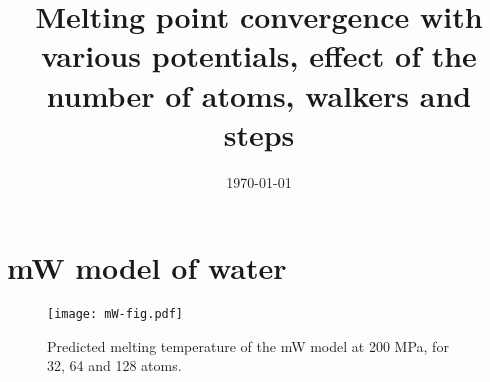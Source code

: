 \documentclass[aps,jcp,preprint,superscriptaddress]{revtex4}
\begin{document}
\title{
Melting point convergence with various potentials, effect of the number of atoms, walkers and steps}


\author{}
\affiliation{}
\email{}

\date{\today}

\maketitle

%
%
\section{mW model of water}
\begin{figure}[hbt]
\begin{center}
\texttt{[image: mW-fig.pdf]}
\end{center}
\vspace{-20pt}
\caption {Predicted melting temperature of the mW model at 200 MPa, for 32, 64 and 128 atoms.}
\label{fig:mW}
\end{figure}
\end{document}
